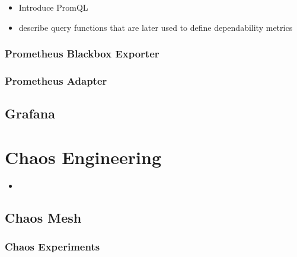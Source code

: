 \begin{itemize}
	\item Introduce PromQL
	\item describe query functions that are later used to define dependability metrics
\end{itemize}

\subsubsection{Prometheus Blackbox Exporter}

\subsubsection{Prometheus Adapter}


\subsection{Grafana}


\section{Chaos Engineering}

\begin{itemize}
	\item 
\end{itemize}

\subsection{Chaos Mesh} \label{background-chaos-mesh}

\subsubsection{Chaos Experiments}

